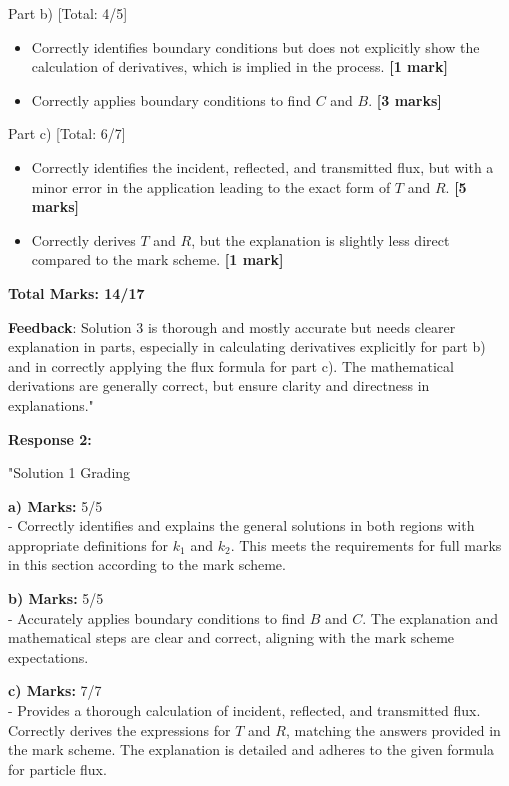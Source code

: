 \documentclass[a4paper,11pt]{article}
\begin{document}
Part b) [Total: 4/5]

\begin{itemize}
    \item Correctly identifies boundary conditions but does not explicitly show the calculation of derivatives, which is implied in the process. \textbf{[1 mark]}
    \item Correctly applies boundary conditions to find \(C\) and \(B\). \textbf{[3 marks]}
\end{itemize}

Part c) [Total: 6/7]

\begin{itemize}
    \item Correctly identifies the incident, reflected, and transmitted flux, but with a minor error in the application leading to the exact form of \(T\) and \(R\). \textbf{[5 marks]}
    \item Correctly derives \(T\) and \(R\), but the explanation is slightly less direct compared to the mark scheme. \textbf{[1 mark]}
\end{itemize}

\textbf{Total Marks: 14/17}

\textbf{Feedback}: Solution 3 is thorough and mostly accurate but needs clearer explanation in parts, especially in calculating derivatives explicitly for part b) and in correctly applying the flux formula for part c). The mathematical derivations are generally correct, but ensure clarity and directness in explanations."

\textbf{Response 2:}

"Solution 1 Grading

\textbf{a) Marks:} 5/5 \\
- Correctly identifies and explains the general solutions in both regions with appropriate definitions for \(k_1\) and \(k_2\). This meets the requirements for full marks in this section according to the mark scheme.

\textbf{b) Marks:} 5/5 \\
- Accurately applies boundary conditions to find \(B\) and \(C\). The explanation and mathematical steps are clear and correct, aligning with the mark scheme expectations.

\textbf{c) Marks:} 7/7 \\
- Provides a thorough calculation of incident, reflected, and transmitted flux. Correctly derives the expressions for \(T\) and \(R\), matching the answers provided in the mark scheme. The explanation is detailed and adheres to the given formula for particle flux.
\end{document}
